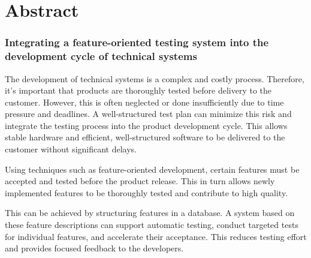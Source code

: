 \chapter*{Abstract}

\subsection*{Integrating a feature-oriented testing system into the development cycle of technical systems}

The development of technical systems is a complex and costly process. Therefore, it's important that products are thoroughly tested before delivery to the customer. However, this is often neglected or done insufficiently due to time pressure and deadlines. A well-structured test plan can minimize this risk and integrate the testing process into the product development cycle. This allows stable hardware and efficient, well-structured software to be delivered to the customer without significant delays.

\smallskip

Using techniques such as feature-oriented development, certain features must be accepted and tested before the product release. This in turn allows newly implemented features to be thoroughly tested and contribute to high quality. 

\smallskip

This can be achieved by structuring features in a database. A system based on these feature descriptions can support automatic testing, conduct targeted tests for individual features, and accelerate their acceptance. This reduces testing effort and provides focused feedback to the developers.

\clearpage
